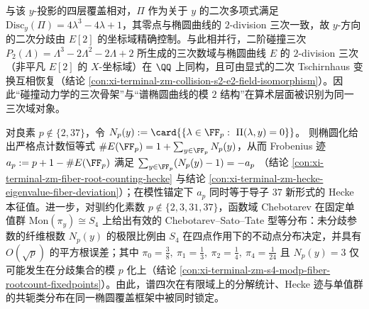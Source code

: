 \par
与该 \(y\)-投影的四层覆盖相对，\(\Pi\) 作为关于 \(y\) 的二次多项式满足 \(\mathrm{Disc}_{y}(\Pi)=4\lambda^3-4\lambda+1\)，其零点与椭圆曲线的 \(2\)-division 三次一致，故 \(y\)-方向的二次分歧由 \(E[2]\) 的坐标域精确控制。与此相并行，二阶碰撞三次
\(
P_2(\Lambda)=\Lambda^3-2\Lambda^2-2\Lambda+2
\)
所生成的三次数域与椭圆曲线 \(E\) 的 \(2\)-division 三次（非平凡 \(E[2]\) 的 \(X\)-坐标域）在 \(\QQ\) 上同构，且可由显式的二次 Tschirnhaus 变换互相恢复（结论 \ref{con:xi-terminal-zm-collision-s2-e2-field-isomorphism}）。因此“碰撞动力学的三次骨架”与“谱椭圆曲线的模 \(2\) 结构”在算术层面被识别为同一三次域对象。
\par


对良素 \(p\notin\{2,37\}\)，令
\(
N_p(y):=\card{\{\lambda\in\FF_p:\ \Pi(\lambda,y)=0\}}
\)。
则椭圆化给出严格点计数恒等式
\(
\#E(\FF_p)=1+\sum_{y\in\FF_p}N_p(y)
\)，从而 Frobenius 迹
\(
a_p:=p+1-\#E(\FF_p)
\)
满足
\(
\sum_{y\in\FF_p}(N_p(y)-1)=-a_p
\)
（结论 \ref{con:xi-terminal-zm-fiber-root-counting-hecke} 与结论 \ref{con:xi-terminal-zm-hecke-eigenvalue-fiber-deviation}）；在模性锚定下 \(a_p\) 同时等于导子 \(37\) 新形式的 Hecke 本征值。进一步，对驯约化素数 \(p\notin\{2,3,31,37\}\)，函数域 Chebotarev 在固定单值群 \(\mathrm{Mon}(\pi_y)\cong S_4\) 上给出有效的 Chebotarev--Sato--Tate 型等分布：未分歧参数的纤维根数 \(N_p(y)\) 的极限比例由 \(S_4\) 在四点作用下的不动点分布决定，并具有 \(O(\sqrt p)\) 的平方根误差；其中
\(
\pi_0=\tfrac38,\ \pi_1=\tfrac13,\ \pi_2=\tfrac14,\ \pi_4=\tfrac1{24}
\)
且 \(N_p(y)=3\) 仅可能发生在分歧集合的模 \(p\) 化上（结论 \ref{con:xi-terminal-zm-s4-modp-fiber-rootcount-fixedpoints}）。由此，谱四次在有限域上的分解统计、Hecke 迹与单值群的共轭类分布在同一椭圆覆盖框架中被同时锁定。
